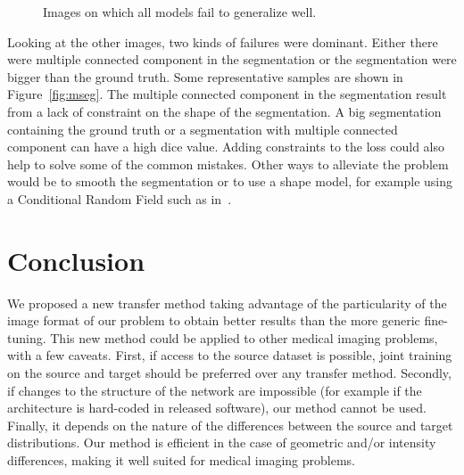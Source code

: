 \begin{figure}[htb]
\begin{subfigure}{.33\textwidth}
\end{subfigure}
\caption{Images on which all models fail to generalize well.}
\label{fig:bad_images}
\end{figure}

Looking at the other images, two kinds of failures were dominant. Either there were multiple connected component in the segmentation or the segmentation were bigger than the ground truth. Some representative samples are shown in Figure~\ref{fig:mseg}. The multiple connected component in the segmentation result from a lack of constraint on the shape of the segmentation. A big segmentation containing the ground truth or a segmentation with multiple connected component can have a high dice value. Adding constraints to the loss could also help to solve some of the common mistakes. Other ways to alleviate the problem would be to smooth the segmentation or to use a shape model, for example using a Conditional Random Field such as in~\textcite{kamnitsas2017MEDIA}.

\section{Conclusion}
\label{sec:transfer_conclusion}

We proposed a new transfer method taking advantage of the particularity of the image format of our problem to obtain better results than the more generic fine-tuning. This new method could be applied to other medical imaging problems, with a few caveats. First, if access to the source dataset is possible, joint training on the source and target should be preferred over any transfer method. Secondly, if changes to the structure of the network are impossible (for example if the architecture is hard-coded in released software), our method cannot be used. Finally, it depends on the nature of the differences between the source and target distributions. Our method is efficient in the case of geometric and/or intensity differences, making it well suited for medical imaging problems.
